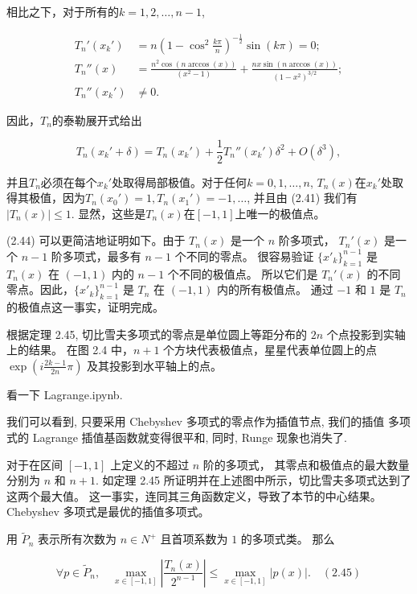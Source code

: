 \documentclass[a4paper]{ctexart}
\begin{document}
{相比之下，对于所有的\(k=1,2,\ldots, n-1\),

\begin{align*}
T_n'(x_k') &= n\left(1-\cos^2\frac{k\pi}{n}\right)^{-\frac{1}{2}}\sin(k\pi) = 0;\\
T_n''(x) &= \frac{n^2\cos(n\arccos(x))}{(x^2-1)} + \frac{nx\sin(n\arccos(x))}{(1-x^2)^{3/2}};\\
T_n''(x_k') &\neq 0.
\end{align*}


因此，\(T_n\)的泰勒展开式给出

\[ T_n(x_k' + \delta) = T_n(x_k') + \frac{1}{2} T_n''(x_k')\delta^2 + O(\delta^3), \]

并且\(T_n\)必须在每个\(x_k'\)处取得局部极值。对于任何\(k=0,1,\ldots, n\),
\(T_n(x)\)在\(x_k'\)处取得其极值，因为\(T_n(x_0') = 1, T_n(x_1') = -1, \ldots\), 并且由 (2.41) 
我们有\(\left|T_n(x)\right| \leq 1\). 显然，这些是\(T_n(x)\)在\([-1,1]\)上唯一的极值点。

 (2.44) 可以更简洁地证明如下。由于 $T_n(x)$ 是一个 $n$ 阶多项式，
$T_n'(x)$ 是一个 $n - 1$ 阶多项式，最多有 $n - 1$ 个不同的零点。
很容易验证 $\{x'_{k}\}_{k=1}^{n-1}$ 是 $T_n(x)$ 在 $(-1, 1)$ 内的 $n - 1$ 个不同的极值点。
所以它们是 $T_n'(x)$ 的不同零点。因此，$\{x'_{k}\}_{k=1}^{n-1}$ 是 $T_n$ 在 $(-1, 1)$ 内的所有极值点。
通过 $-1$ 和 $1$ 是 $T_n$ 的极值点这一事实，证明完成。

 根据定理 2.45, 切比雪夫多项式的零点是单位圆上等距分布的 $2n$ 个点投影到实轴上的结果。
在图 2.4 中，$n + 1$ 个方块代表极值点，星星代表单位圆上的点 $\exp\left(i \frac{2k-1}{2n} \pi\right)$ 及其投影到水平轴上的点。

看一下 Lagrange.ipynb.

我们可以看到, 只要采用 Chebyshev 多项式的零点作为插值节点, 我们的插值
多项式的 Lagrange 插值基函数就变得很平和, 同时, Runge 现象也消失了.

 对于在区间 $[-1, 1]$ 上定义的不超过 $n$ 阶的多项式，
其零点和极值点的最大数量分别为 $n$ 和 $n + 1$. 
如定理 2.45 所证明并在上述图中所示，切比雪夫多项式达到了这两个最大值。
这一事实，连同其三角函数定义，导致了本节的中心结果。Chebyshev 多项式是最优的插值多项式。

 用 \(\tilde{P}_{n}\) 表示所有次数为 \(n \in N^{+}\) 且首项系数为 $1$ 的多项式类。
那么

\[ \forall p \in \tilde{P}_{n}, \quad \max_{x \in [-1,1]} \left| \frac{T_{n}(x)}{2^{n-1}} \right| \leq \max_{x \in [-1,1]} |p(x)|. \quad (2.45) \]

}
\end{document}
